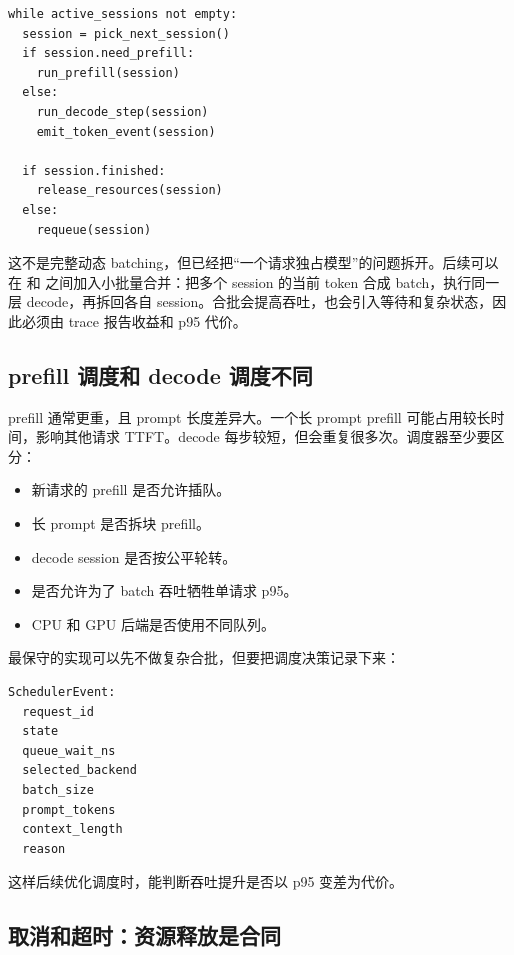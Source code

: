 \begin{lstlisting}[numbers=none,caption={step-level decode 调度}]
while active_sessions not empty:
  session = pick_next_session()
  if session.need_prefill:
    run_prefill(session)
  else:
    run_decode_step(session)
    emit_token_event(session)

  if session.finished:
    release_resources(session)
  else:
    requeue(session)
\end{lstlisting}

这不是完整动态 batching，但已经把“一个请求独占模型”的问题拆开。后续可以在  和  之间加入小批量合并：把多个 session 的当前 token 合成 batch，执行同一层 decode，再拆回各自 session。合批会提高吞吐，也会引入等待和复杂状态，因此必须由 trace 报告收益和 p95 代价。

\subsection{prefill 调度和 decode 调度不同}

prefill 通常更重，且 prompt 长度差异大。一个长 prompt prefill 可能占用较长时间，影响其他请求 TTFT。decode 每步较短，但会重复很多次。调度器至少要区分：

\begin{itemize}
  \item 新请求的 prefill 是否允许插队。
  \item 长 prompt 是否拆块 prefill。
  \item decode session 是否按公平轮转。
  \item 是否允许为了 batch 吞吐牺牲单请求 p95。
  \item CPU 和 GPU 后端是否使用不同队列。
\end{itemize}

最保守的实现可以先不做复杂合批，但要把调度决策记录下来：

\begin{lstlisting}[numbers=none,caption={SchedulerEvent 字段}]
SchedulerEvent:
  request_id
  state
  queue_wait_ns
  selected_backend
  batch_size
  prompt_tokens
  context_length
  reason
\end{lstlisting}

这样后续优化调度时，能判断吞吐提升是否以 p95 变差为代价。

\subsection{取消和超时：资源释放是合同}


